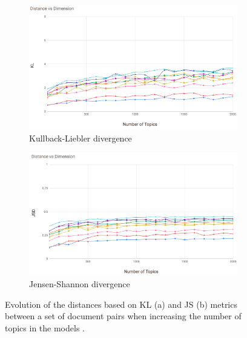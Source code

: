 \begin{figure}[]
\begin{subfigure}[b]{1.0\linewidth}
\centering
\includegraphics[width=\linewidth]{KL_100_2k.png}
\caption{Kullback-Liebler divergence}
\vspace{4ex}
\end{subfigure}
\begin{subfigure}[b]{1.0\linewidth}
\centering
\includegraphics[width=\linewidth]{JSD_100_2k.png}
\caption{Jensen-Shannon divergence}
\vspace{4ex}
\end{subfigure}
\caption{Evolution of the distances based on KL (a) and JS (b) metrics between a set of document pairs when increasing the number of topics in the models  \citep{Badenes-Olmedo2020}.}
\label{fig:topic_distances}
\end{figure}

